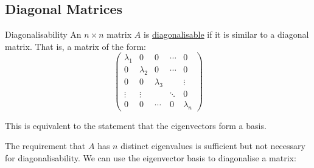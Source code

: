 \documentclass[../Main.tex]{subfiles}
\begin{document}
\subsection{Diagonal Matrices}
\begin{definition}{Diagonalisability}
An $n \times n$ matrix $A$ is \underline{diagonalisable} if it is similar to a diagonal matrix. That is, a matrix of the form:
    \begin{equation*}
        \begin{pmatrix}
            \lambda_1 & 0 & 0 & \cdots & 0 \\
            0 & \lambda_2 & 0 & \cdots & 0 \\
            0 & 0 & \lambda_3 & & \vdots \\
            \vdots & \vdots & & \ddots & 0 \\
            0 & 0 & \cdots & 0 & \lambda_n
        \end{pmatrix}
    \end{equation*}
\end{definition}
This is equivalent to the statement that the eigenvectors form a basis.\par
The requirement that $A$ has $n$ distinct eigenvalues is sufficient but not necessary for diagonalisability. We can use the eigenvector basis to diagonalise a matrix:
\end{document}
